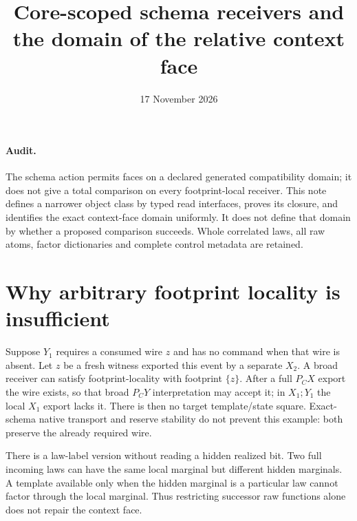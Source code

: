 \documentclass[11pt]{article}
\title{Core-scoped schema receivers and the domain of the relative context face}
\date{17 November 2026}
\begin{document}
\maketitle
\paragraph{Audit.} The schema action permits faces on a declared generated compatibility domain; it does not give a total comparison on every footprint-local receiver. This note defines a narrower object class by typed read interfaces, proves its closure, and identifies the exact context-face domain uniformly. It does not define that domain by whether a proposed comparison succeeds. Whole correlated laws, all raw atoms, factor dictionaries and complete control metadata are retained.

\section{Why arbitrary footprint locality is insufficient}
Suppose $Y_1$ requires a consumed wire $z$ and has no command when that wire is absent. Let $z$ be a fresh witness exported this event by a separate $X_2$. A broad receiver can satisfy footprint-locality with footprint $\{z\}$. After a full $P_CX$ export the wire exists, so that broad $P_CY$ interpretation may accept it; in $X_1;Y_1$ the local $X_1$ export lacks it. There is then no target template/state square. Exact-schema native transport and reserve stability do not prevent this example: both preserve the already required wire.

There is a law-label version without reading a hidden realized bit. Two full incoming laws can have the same local marginal but different hidden marginals. A template available only when the hidden marginal is a particular law cannot factor through the local marginal. Thus restricting successor raw functions alone does not repair the context face.
\end{document}
